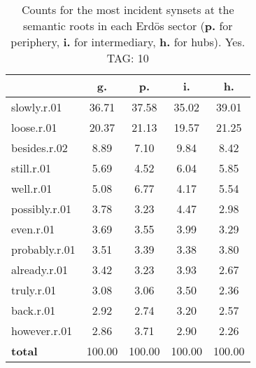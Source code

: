 \begin{table}[h!]
\begin{center}
\begin{tabular}{| l | c | c | c | c |}\hline
 & g. & p. & i. & h. \\\hline
slowly.r.01 & 36.71  & 37.58  & 35.02  & 39.01 \\\hline
loose.r.01 & 20.37  & 21.13  & 19.57  & 21.25 \\\hline
besides.r.02 & 8.89  & 7.10  & 9.84  & 8.42 \\\hline
still.r.01 & 5.69  & 4.52  & 6.04  & 5.85 \\\hline
well.r.01 & 5.08  & 6.77  & 4.17  & 5.54 \\\hline
possibly.r.01 & 3.78  & 3.23  & 4.47  & 2.98 \\\hline
even.r.01 & 3.69  & 3.55  & 3.99  & 3.29 \\\hline
probably.r.01 & 3.51  & 3.39  & 3.38  & 3.80 \\\hline
already.r.01 & 3.42  & 3.23  & 3.93  & 2.67 \\\hline
truly.r.01 & 3.08  & 3.06  & 3.50  & 2.36 \\\hline
back.r.01 & 2.92  & 2.74  & 3.20  & 2.57 \\\hline
however.r.01 & 2.86  & 3.71  & 2.90  & 2.26 \\\hline
{{\bf total}} & 100.00  & 100.00  & 100.00  & 100.00 \\\hline
\end{tabular}
\caption{Counts for the most incident synsets at the semantic roots in each Erd\"os sector ({\bf p.} for periphery, {\bf i.} for intermediary, {\bf h.} for hubs). Yes. TAG: 10}
\end{center}
\end{table}